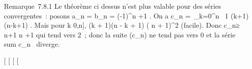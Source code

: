 \documentclass[]{article}
\begin{document}
Remarque~7.8.1 Le théorème ci dessus n'est plus valable pour des séries
convergentes~: posons a\_n = b\_n = (-1)^n
\over \sqrtn+1 . On a
\textbar{}c\_n\textbar{} =\
\sum  \_k=0^n~ 1
\over \sqrt(k+1)(n-k+1) . Mais pour
k \in {[}0,n{]}, (k + 1)(n - k + 1) \leq ( n  +
1)^2 (facile). Donc \textbar{}c\_n\textbar{}≥ n+1
\over  n \over 2 +1 qui tend vers
2~; donc la suite (c\_n) ne tend pas vers 0 et la série
\\sum  c\_n~
diverge.

{[}
{[}
{[}
{[}
\end{document}
